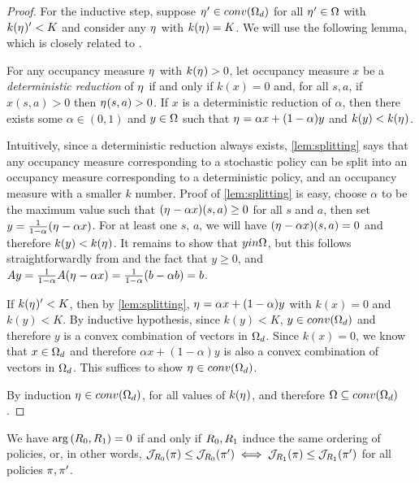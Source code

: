 \begin{proof}
For the inductive step, suppose $\mathbf{\eta^{}}' \in conv(\Omega_d)$ for all $\mathbf{\eta^{}}' \in \Omega$ with $k(\mathbf{\eta^{}})' < K$ and consider any $\mathbf{\eta^{}}$ with $k(\mathbf{\eta^{}})=K$. We will use the following lemma, which is closely related to \citep[Lemma~6.3]{feinberg2012}.

\begin{lemma}\label{lem:splitting}
For any occupancy measure $\mathbf{\eta^{}}$ with $k(\mathbf{\eta^{}})>0$, let occupancy measure $x$ be a \textit{deterministic reduction} of $\mathbf{\eta^{}}$ if and only if $k(x)=0$ and, for all $s,a$, if $x(s,a)>0$ then $\mathbf{\eta^{}}(s,a)>0$. If $x$ is a deterministic reduction of $\alpha$, then there exists some $\alpha \in (0,1)$ and $y \in \Omega$ such that $\mathbf{\eta^{}} = \alpha x + (1-\alpha) y$ and $k(y) < k(\mathbf{\eta^{}})$.
\end{lemma}
Intuitively, since a deterministic reduction always exists, \cref{lem:splitting} says that any occupancy measure corresponding to a stochastic policy can be split into an occupancy measure corresponding to a deterministic policy, and an occupancy measure with a smaller $k$ number. Proof of \cref{lem:splitting} is easy, choose $\alpha$ to be the maximum value such that $(\mathbf{\eta^{}} - \alpha x)(s,a) \geq 0$ for all $s$ and $a$, then set $y = \frac{1}{1-\alpha}(\mathbf{\eta^{}} - \alpha x)$. For at least one $s$, $a$, we will have $(\mathbf{\eta^{}} - \alpha x)(s,a)=0$ and therefore $k(y) < k(\mathbf{\eta^{}})$. It remains to show that $y in \Omega$, but this follows straightforwardly from \cite[Theorem~6.9.1]{puterman1994} and the fact that $y \geq 0$, and $Ay=\frac{1}{1-\alpha}A(\mathbf{\eta^{}} - \alpha x)=\frac{1}{1-\alpha}(b-\alpha b) =b$.

If $k(\mathbf{\eta^{}})' < K$, then by \cref{lem:splitting}, $\mathbf{\eta^{}} = \alpha x + (1-\alpha) y$ with $k(x)=0$ and $k(y)<K$. By inductive hypothesis, since $k(y)<K$, $y \in conv(\Omega_d)$ and therefore $y$ is a convex combination of vectors in $\Omega_d$. Since $k(x)=0$, we know that $x \in \Omega_d$ and therefore $\alpha x + (1-\alpha) y$ is also a convex combination of vectors in $\Omega_d$. This suffices to show $\mathbf{\eta^{}} \in conv(\Omega_d)$.

By induction $\mathbf{\eta^{}} \in conv(\Omega_d)$, for all values of $k(\mathbf{\eta^{}})$, and therefore $\Omega \subseteq conv(\Omega_d)$.

\end{proof}


\begin{proposition}
We have $\mathrm{arg}\left({R_0}, {R_1}\right) = 0$ if and only if $R_0, R_1$ induce the same ordering of policies, or, in other words, $\mathcal{J}_{R_0}(\pi) \leq \mathcal{J}_{R_0}(\pi') \iff \mathcal{J}_{R_1}(\pi) \leq \mathcal{J}_{R_1}(\pi')$ for all policies $\pi, \pi'$.
\end{proposition}

